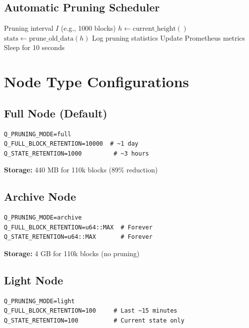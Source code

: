 \documentclass[11pt,a4paper]{article}
\begin{document}
\subsection{Automatic Pruning Scheduler}

\begin{algorithm}[H]
\caption{Continuous Pruning Daemon}
\begin{algorithmic}
\REQUIRE Pruning interval $I$ (e.g., 1000 blocks)
    \STATE $h \leftarrow \text{current\_height}()$
        \STATE $\text{stats} \leftarrow \text{prune\_old\_data}(h)$
        \STATE Log pruning statistics
        \STATE Update Prometheus metrics
    \ENDIF
    \STATE Sleep for 10 seconds
\ENDWHILE
\end{algorithmic}
\end{algorithm}

\section{Node Type Configurations}

\subsection{Full Node (Default)}

\begin{lstlisting}
Q_PRUNING_MODE=full
Q_FULL_BLOCK_RETENTION=10000  # ~1 day
Q_STATE_RETENTION=1000         # ~3 hours
\end{lstlisting}

\textbf{Storage:} 440 MB for 110k blocks (89\% reduction)

\subsection{Archive Node}

\begin{lstlisting}
Q_PRUNING_MODE=archive
Q_FULL_BLOCK_RETENTION=u64::MAX  # Forever
Q_STATE_RETENTION=u64::MAX       # Forever
\end{lstlisting}

\textbf{Storage:} 4 GB for 110k blocks (no pruning)

\subsection{Light Node}

\begin{lstlisting}
Q_PRUNING_MODE=light
Q_FULL_BLOCK_RETENTION=100     # Last ~15 minutes
Q_STATE_RETENTION=100          # Current state only
\end{lstlisting}
\end{document}
